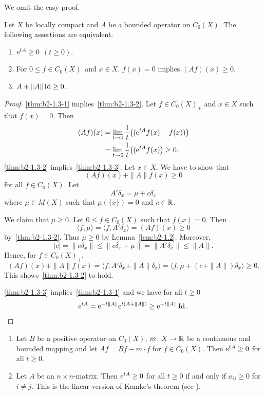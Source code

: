 We omit the easy proof.
\begin{theorem}\label{thm:b2-1.3}
Let $X$ be locally compact and $A$ be a bounded operator on $C_{0}(X)$.
The following assertions are equivalent.
\begin{enumerate}[\upshape (a)]
\item \label{thm:b2-1.3-1}
$\eu^{tA} \geq 0$ $(t \geq 0)$.
\item \label{thm:b2-1.3-2}
For  $0 \leq f \in C_{0}(X)$\, and  $x \in X$,  $f(x) = 0$ implies $(Af)(x) \geq 0$.
\item \label{thm:b2-1.3-3}
$A + \|A\|\Id \geq 0$.
\end{enumerate}
\end{theorem}
\begin{proof}
\ref{thm:b2-1.3-1} implies~\ref{thm:b2-1.3-2}.
Let $f \in C_{0}(X)_{+}$ and $x \in X$ such that $f(x) = 0$.
Then
\begin{align*}
(Af)(x) &= \lim_{t \to 0} \frac{1}{t} \mleft( (\eu^{tA}f(x) - f(x)) \mright) \\
&= \lim_{t \to 0}\frac{1}{t} \mleft( (\eu^{tA}f(x) \mright) \geq 0 .
\end{align*}
\ref{thm:b2-1.3-2} implies~\ref{thm:b2-1.3-3}.
Let $x \in X$.
We have to show that 
%
\[
	(Af)(x) + \|A\|f(x) \geq 0
\]
%
for all $f \in C_{0}(X)$.
Let 
%
\[
	A'\delta_{x} = \mu + c\delta_{x}
\]
%
where $\mu \in M(X)$ such that $\mu(\{x\}) = 0$ and $c \in \mathbb{R}$.

We claim that $\mu \geq 0$.
Let $0 \leq f \in C_{0}(X)$ such that $f(x) = 0$.
Then 
%
\[
	\langle f,\mu \rangle = \langle f,A'\delta_{x} \rangle = (Af)(x) \geq 0 
\]
%
by~\ref{thm:b2-1.3-2}.
Thus $\mu \geq 0$ by Lemma~\ref{lem:b2-1.2}.
Moreover, 
%
\[
	|c| = \|c\delta_{x}\| \leq \|c\delta_{x} + \mu\| = \|A'\delta_{x}\| \leq \|A\| .
\]
%
Hence, for $f \in C_{0}(X)_{+}$,
\[
(Af)(x) + \|A\|f(x) = \langle f, A'\delta_{x} + \|A\|\delta_{x} \rangle = \langle f, \mu + (c+\|A\|)\delta_{x} \rangle \geq 0.
\]
This shows~\ref{thm:b2-1.3-2} to hold.

\ref{thm:b2-1.3-3} implies~\ref{thm:b2-1.3-1} and we have for all $t \geq 0$
%
\begin{equation*}
	\eu^{tA} = \eu^{-t\|A\|}\eu^{t(A+\|A\|)} \geq \eu^{-t\|A\|}\Id .
	\qedhere
\end{equation*}
%
\end{proof}
\begin{example}\label{ex:b2-1.4} 
 
\begin{enumerate}[\upshape (i), wide, labelindent=.5ex] 
\item \label{ex:b2-1.4-1}
Let $B$ be a positive operator on $C_{0}(X)$, $m \colon X \to \mathbb{R}$ be a continuous and bounded mapping and let $Af = Bf - m \cdot f$ for $f \in C_{0}(X)$.
Then $\eu^{tA} \geq 0$ for all $t \geq 0$.
		
\item \label{ex:b2-1.4-2}
Let $A$ be an $n \times n$-matrix.
Then $\eu^{tA} \geq 0$ for all $t \geq 0$ if and only if\/ $a_{ij} \geq 0$ for $i \neq j$.
This is the linear version of Kamke's theorem (see \textcite{kamke:1932}).
\end{enumerate}
\end{example}
